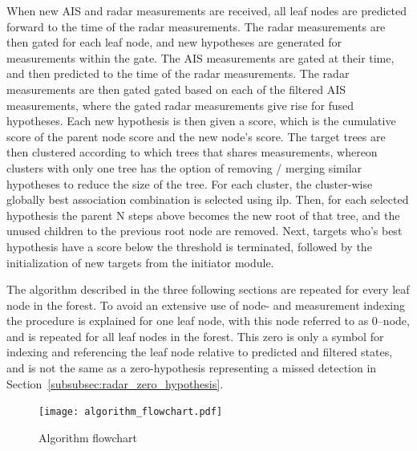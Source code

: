  When new 	AIS and radar measurements are received, all leaf nodes are predicted forward to the time of the radar measurements. The radar measurements are then gated for each leaf node, and new hypotheses are generated for measurements within the gate. The AIS measurements are gated at their time, and then predicted to the time of the radar measurements. The radar measurements are then gated gated based on each of the filtered AIS measurements, where the gated radar measurements give rise for fused hypotheses. Each new hypothesis is then given a score, which is the cumulative score of the parent node score and the new node's score. The target trees are then clustered according to which trees that shares measurements, whereon clusters with only one tree has the option of removing / merging similar hypotheses to reduce the size of the tree. For each cluster, the cluster-wise globally best association combination is selected using \gls{ilp}. Then, for each selected hypothesis the parent N steps above becomes the new root of that tree, and the unused children to the previous root node are removed. Next, targets who's best hypothesis have a score below the threshold is terminated, followed by the initialization of new targets from the initiator module. 

 The algorithm described in the three following sections are repeated for every leaf node in the forest. To avoid an extensive use of node- and measurement indexing the procedure is explained for one leaf node, with this node referred to as 0--node, and is repeated for all leaf nodes in the forest. This zero is only a symbol for indexing and referencing the leaf node relative to predicted and filtered states, and is not the same as a zero-hypothesis representing a missed detection in Section~\ref{subsubsec:radar_zero_hypothesis}. 
\begin{figure}[H]
\centering
\texttt{[image: algorithm\_flowchart.pdf]}
\caption{Algorithm flowchart}\label{fig:algorithm_flow}
\end{figure}

